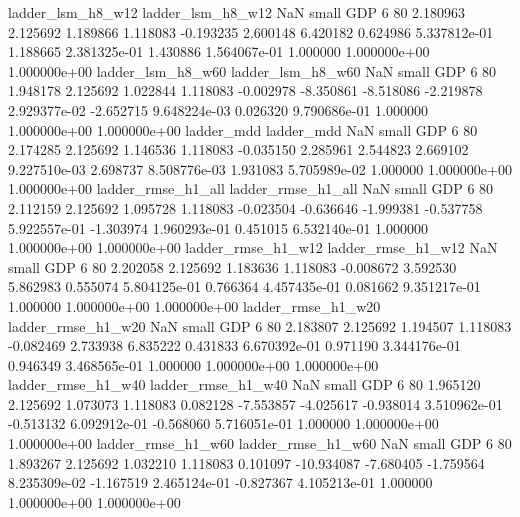        ladder_lsm_h8_w12        ladder_lsm_h8_w12                   NaN      small      GDP                 6 80 2.180963       2.125692 1.189866       1.118083   -0.193235      2.600148      6.420182     0.624986   5.337812e-01  1.188665 2.381325e-01     1.430886   1.564067e-01            1.000000    1.000000e+00        1.000000e+00
       ladder_lsm_h8_w60        ladder_lsm_h8_w60                   NaN      small      GDP                 6 80 1.948178       2.125692 1.022844       1.118083   -0.002978     -8.350861     -8.518086    -2.219878   2.929377e-02 -2.652715 9.648224e-03     0.026320   9.790686e-01            1.000000    1.000000e+00        1.000000e+00
              ladder_mdd               ladder_mdd                   NaN      small      GDP                 6 80 2.174285       2.125692 1.146536       1.118083   -0.035150      2.285961      2.544823     2.669102   9.227510e-03  2.698737 8.508776e-03     1.931083   5.705989e-02            1.000000    1.000000e+00        1.000000e+00
      ladder_rmse_h1_all       ladder_rmse_h1_all                   NaN      small      GDP                 6 80 2.112159       2.125692 1.095728       1.118083   -0.023504     -0.636646     -1.999381    -0.537758   5.922557e-01 -1.303974 1.960293e-01     0.451015   6.532140e-01            1.000000    1.000000e+00        1.000000e+00
      ladder_rmse_h1_w12       ladder_rmse_h1_w12                   NaN      small      GDP                 6 80 2.202058       2.125692 1.183636       1.118083   -0.008672      3.592530      5.862983     0.555074   5.804125e-01  0.766364 4.457435e-01     0.081662   9.351217e-01            1.000000    1.000000e+00        1.000000e+00
      ladder_rmse_h1_w20       ladder_rmse_h1_w20                   NaN      small      GDP                 6 80 2.183807       2.125692 1.194507       1.118083   -0.082469      2.733938      6.835222     0.431833   6.670392e-01  0.971190 3.344176e-01     0.946349   3.468565e-01            1.000000    1.000000e+00        1.000000e+00
      ladder_rmse_h1_w40       ladder_rmse_h1_w40                   NaN      small      GDP                 6 80 1.965120       2.125692 1.073073       1.118083    0.082128     -7.553857     -4.025617    -0.938014   3.510962e-01 -0.513132 6.092912e-01    -0.568060   5.716051e-01            1.000000    1.000000e+00        1.000000e+00
      ladder_rmse_h1_w60       ladder_rmse_h1_w60                   NaN      small      GDP                 6 80 1.893267       2.125692 1.032210       1.118083    0.101097    -10.934087     -7.680405    -1.759564   8.235309e-02 -1.167519 2.465124e-01    -0.827367   4.105213e-01            1.000000    1.000000e+00        1.000000e+00
